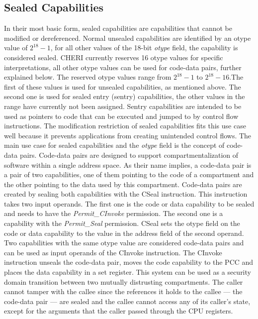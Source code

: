 \subsection{Sealed Capabilities}
\label{sec:sealed}
In their most basic form, sealed capabilities are capabilities that cannot be modified or dereferenced. Normal unsealed capabilities are identified by an otype value of $2^{18} - 1$, for all other values of the 18-bit \textit{otype} field, the capability is considered sealed. CHERI currently reserves 16 otype values for specific interpretations, all other otype values can be used for code-data pairs, further explained below. The reserved otype values range from $2^{18} - 1$ to $2^{18} - 16$.The first of these values is used for unsealed capabilities, as mentioned above. The second one is used for sealed entry (sentry) capabilities, the other values in the range have currently not been assigned. Sentry capabilities are intended to be used as pointers to code that can be executed and jumped to by control flow instructions. The modification restriction of sealed capabilities fits this use case well because it prevents applications from creating unintended control flows.
The main use case for sealed capabilities and the \textit{otype} field is the concept of code-data pairs. Code-data pairs are designed to support compartmentalization of software within a single address space. As their name implies, a code-data pair is a pair of two capabilities, one of them pointing to the code of a compartment and the other pointing to the data used by this compartment. Code-data pairs are created by sealing both capabilities with the CSeal instruction. This instruction takes two input operands. The first one is the code or data capability to be sealed and needs to have the \textit{Permit\_CInvoke} permission. The second one is a capability with the \textit{Permit\_Seal} permission. CSeal sets the otype field on the code or data capability to the value in the address field of the second operand. Two capabilities with the same otype value are considered code-data pairs and can be used as input operands of the CInvoke instruction. The CInvoke instruction unseals the code-data pair, moves the code capability to the PCC and places the data capability in a set register. This system can be used as a security domain transition between two mutually distrusting compartments. The caller cannot tamper with the callee since the references it holds to the callee --- the code-data pair --- are sealed and the callee cannot access any of its caller's state, except for the arguments that the caller passed through the CPU registers.

